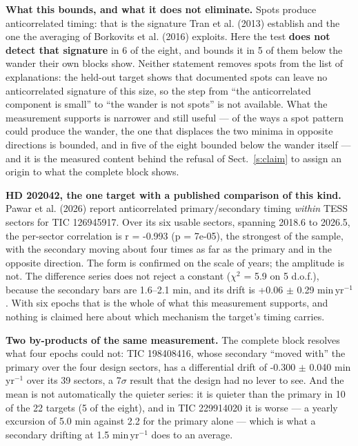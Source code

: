 \documentclass{aa}
\begin{document}
\textbf{What this bounds, and what it does not eliminate.} Spots produce anticorrelated timing: that is the signature Tran et al. (2013) establish and the one the averaging of Borkovits et al. (2016) exploits. Here the test \textbf{does not detect that signature} in 6 of the eight, and bounds it in 5 of them below the wander their own blocks show. Neither statement removes spots from the list of explanations: the held-out target shows that documented spots can leave no anticorrelated signature of this size, so the step from ``the anticorrelated component is small'' to ``the wander is not spots'' is not available. What the measurement supports is narrower and still useful --- of the ways a spot pattern could produce the wander, the one that displaces the two minima in opposite directions is bounded, and in five of the eight bounded below the wander itself --- and it is the measured content behind the refusal of Sect.~\ref{s:claim} to assign an origin to what the complete block shows.

\textbf{HD 202042, the one target with a published comparison of this kind.} Pawar et al. (2026) report anticorrelated primary/secondary timing \textit{within} TESS sectors for TIC 126945917. Over its six usable sectors, spanning 2018.6 to 2026.5, the per-sector correlation is r = -0.993 (p = 7e-05), the strongest of the sample, with the secondary moving about four times as far as the primary and in the opposite direction. The form is confirmed on the scale of years; the amplitude is not. The difference series does not reject a constant ($\chi^2$ = 5.9 on 5 d.o.f.), because the secondary bars are 1.6--2.1 min, and its drift is +0.06 $\pm$ 0.29 min\,yr$^{-1}$. With six epochs that is the whole of what this measurement supports, and nothing is claimed here about which mechanism the target's timing carries.

\textbf{Two by-products of the same measurement.} The complete block resolves what four epochs could not: TIC 198408416, whose secondary ``moved with'' the primary over the four design sectors, has a differential drift of -0.300 $\pm$ 0.040 min\,yr$^{-1}$ over its 39 sectors, a 7$\sigma$ result that the design had no lever to see. And the mean is not automatically the quieter series: it is quieter than the primary in 10 of the 22 targets (5 of the eight), and in TIC 229914020 it is worse --- a yearly excursion of 5.0 min against 2.2 for the primary alone --- which is what a secondary drifting at 1.5 min\,yr$^{-1}$ does to an average.
\end{document}
